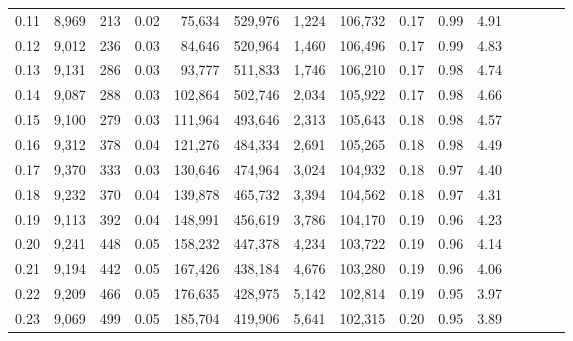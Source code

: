 \begin{tabular}{rrrcrrrrrrrrrrr}
0.11 &  8,969 &    213 &                                       0.02 &   75,634 &  529,976 &    1,224 &  106,732 &  0.17 &  0.99 &                         4.91 \\
0.12 &  9,012 &    236 &                                       0.03 &   84,646 &  520,964 &    1,460 &  106,496 &  0.17 &  0.99 &                         4.83 \\
0.13 &  9,131 &    286 &                                       0.03 &   93,777 &  511,833 &    1,746 &  106,210 &  0.17 &  0.98 &                         4.74 \\
0.14 &  9,087 &    288 &                                       0.03 &  102,864 &  502,746 &    2,034 &  105,922 &  0.17 &  0.98 &                         4.66 \\
0.15 &  9,100 &    279 &                                       0.03 &  111,964 &  493,646 &    2,313 &  105,643 &  0.18 &  0.98 &                         4.57 \\
0.16 &  9,312 &    378 &                                       0.04 &  121,276 &  484,334 &    2,691 &  105,265 &  0.18 &  0.98 &                         4.49 \\
0.17 &  9,370 &    333 &                                       0.03 &  130,646 &  474,964 &    3,024 &  104,932 &  0.18 &  0.97 &                         4.40 \\
0.18 &  9,232 &    370 &                                       0.04 &  139,878 &  465,732 &    3,394 &  104,562 &  0.18 &  0.97 &                         4.31 \\
0.19 &  9,113 &    392 &                                       0.04 &  148,991 &  456,619 &    3,786 &  104,170 &  0.19 &  0.96 &                         4.23 \\
0.20 &  9,241 &    448 &                                       0.05 &  158,232 &  447,378 &    4,234 &  103,722 &  0.19 &  0.96 &                         4.14 \\
0.21 &  9,194 &    442 &                                       0.05 &  167,426 &  438,184 &    4,676 &  103,280 &  0.19 &  0.96 &                         4.06 \\
0.22 &  9,209 &    466 &                                       0.05 &  176,635 &  428,975 &    5,142 &  102,814 &  0.19 &  0.95 &                         3.97 \\
0.23 &  9,069 &    499 &                                       0.05 &  185,704 &  419,906 &    5,641 &  102,315 &  0.20 &  0.95 &                         3.89 \\

\end{tabular}
